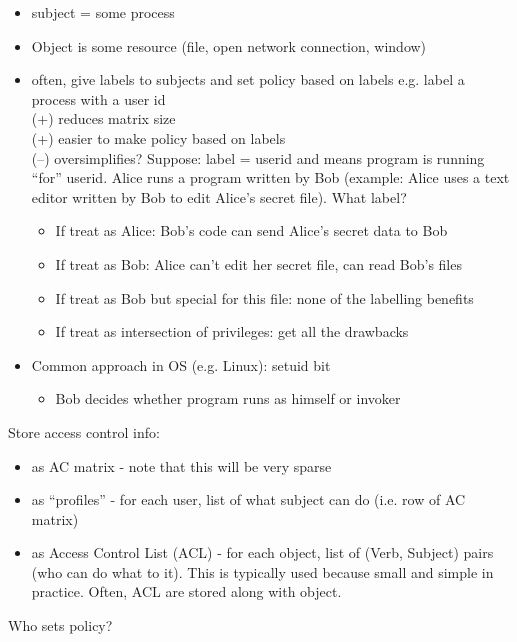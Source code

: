 \begin{itemize}
    \item subject = some process
    \item Object is some resource (file, open network connection, window)
    \item often, give labels to subjects and set policy based on labels
    e.g. label a process with a user id\\
    (+) reduces matrix size\\
    (+) easier to make policy based on labels\\
    (--) oversimplifies? Suppose: label = userid and means program is running
    ``for'' userid. Alice runs a program written by Bob (example: Alice uses a
        text editor written by Bob to edit Alice's secret file). What label?
    \begin{itemize}
        \item If treat as Alice: Bob's code can send Alice's secret data to Bob
        \item If treat as Bob: Alice can't edit her secret file, can read Bob's files
        \item If treat as Bob but special for this file: none of the labelling
        benefits
        \item If treat as intersection of privileges: get all the drawbacks
    \end{itemize}
    \item Common approach in OS (e.g. Linux): setuid bit
   	 \begin{itemize}
    	\item Bob decides whether program runs as himself or invoker
    	\end{itemize}
\end{itemize}
Store access control info:
\begin{itemize}
    \item as AC matrix - note that this will be very sparse
    \item as ``profiles'' - for each user, list of what subject can do (i.e. row of AC matrix)
    \item as Access Control List (ACL) - for each object, list of (Verb,
            Subject) pairs (who can do what to it). This is typically used
    because small and simple in practice. Often, ACL are stored along with object.
\end{itemize}
Who sets policy?
